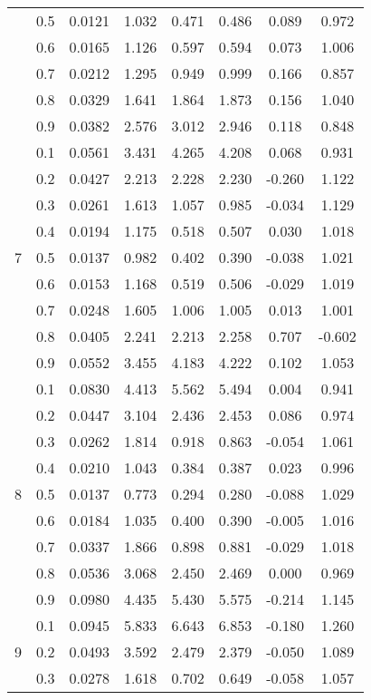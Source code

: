 \documentclass[11pt,a4paper]{report}
\begin{document}
\begin{longtable}{ | c | c || c | c | c | c | c | c | }
 & 0.5 & 0.0121 & 1.032 & 0.471 & 0.486 & 0.089 & 0.972 \\
 & 0.6 & 0.0165 & 1.126 & 0.597 & 0.594 & 0.073 & 1.006 \\
 & 0.7 & 0.0212 & 1.295 & 0.949 & 0.999 & 0.166 & 0.857 \\
 & 0.8 & 0.0329 & 1.641 & 1.864 & 1.873 & 0.156 & 1.040 \\
 & 0.9 & 0.0382 & 2.576 & 3.012 & 2.946 & 0.118 & 0.848 \\
 \hline
\multirow{9}{*}{7} & 0.1 & 0.0561 & 3.431 & 4.265 & 4.208 & 0.068 & 0.931 \\
 & 0.2 & 0.0427 & 2.213 & 2.228 & 2.230 & -0.260 & 1.122 \\
 & 0.3 & 0.0261 & 1.613 & 1.057 & 0.985 & -0.034 & 1.129 \\
 & 0.4 & 0.0194 & 1.175 & 0.518 & 0.507 & 0.030 & 1.018 \\
 & 0.5 & 0.0137 & 0.982 & 0.402 & 0.390 & -0.038 & 1.021 \\
 & 0.6 & 0.0153 & 1.168 & 0.519 & 0.506 & -0.029 & 1.019 \\
 & 0.7 & 0.0248 & 1.605 & 1.006 & 1.005 & 0.013 & 1.001 \\
 & 0.8 & 0.0405 & 2.241 & 2.213 & 2.258 & 0.707 & -0.602 \\
 & 0.9 & 0.0552 & 3.455 & 4.183 & 4.222 & 0.102 & 1.053 \\
 \hline
\multirow{9}{*}{8} & 0.1 & 0.0830 & 4.413 & 5.562 & 5.494 & 0.004 & 0.941 \\
 & 0.2 & 0.0447 & 3.104 & 2.436 & 2.453 & 0.086 & 0.974 \\
 & 0.3 & 0.0262 & 1.814 & 0.918 & 0.863 & -0.054 & 1.061 \\
 & 0.4 & 0.0210 & 1.043 & 0.384 & 0.387 & 0.023 & 0.996 \\
 & 0.5 & 0.0137 & 0.773 & 0.294 & 0.280 & -0.088 & 1.029 \\
 & 0.6 & 0.0184 & 1.035 & 0.400 & 0.390 & -0.005 & 1.016 \\
 & 0.7 & 0.0337 & 1.866 & 0.898 & 0.881 & -0.029 & 1.018 \\
 & 0.8 & 0.0536 & 3.068 & 2.450 & 2.469 & 0.000 & 0.969 \\
 & 0.9 & 0.0980 & 4.435 & 5.430 & 5.575 & -0.214 & 1.145 \\
 \hline
\multirow{9}{*}{9} & 0.1 & 0.0945 & 5.833 & 6.643 & 6.853 & -0.180 & 1.260 \\
 & 0.2 & 0.0493 & 3.592 & 2.479 & 2.379 & -0.050 & 1.089 \\
 & 0.3 & 0.0278 & 1.618 & 0.702 & 0.649 & -0.058 & 1.057 \\

\end{longtable}
\end{document}

